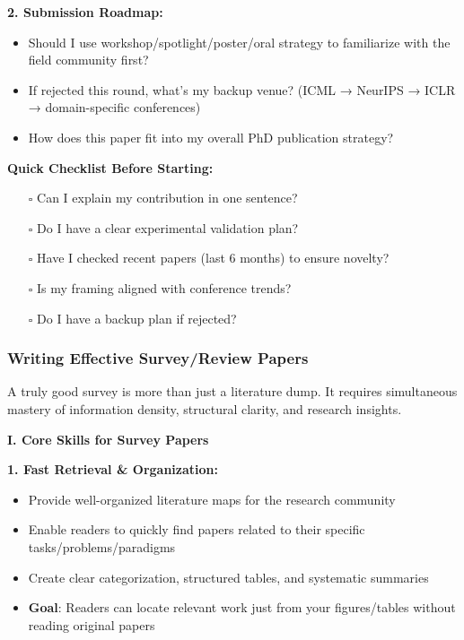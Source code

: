 \documentclass[11pt,a4paper]{article}
\begin{document}
\textbf{2. Submission Roadmap:}
\begin{itemize}
    \item Should I use workshop/spotlight/poster/oral strategy to familiarize with the field community first?
    \item If rejected this round, what's my backup venue? (ICML → NeurIPS → ICLR → domain-specific conferences)
    \item How does this paper fit into my overall PhD publication strategy?
\end{itemize}

\textbf{Quick Checklist Before Starting:}
\begin{enumerate}
    \item[$\square$] Can I explain my contribution in one sentence?
    \item[$\square$] Do I have a clear experimental validation plan?
    \item[$\square$] Have I checked recent papers (last 6 months) to ensure novelty?
    \item[$\square$] Is my framing aligned with conference trends?
    \item[$\square$] Do I have a backup plan if rejected?
\end{enumerate}

\subsubsection{Writing Effective Survey/Review Papers}

\begin{tcolorbox}[colback=green!5,colframe=green!50,title=The Value of Survey Papers]
A truly good survey is more than just a literature dump. It requires simultaneous mastery of information density, structural clarity, and research insights.
\end{tcolorbox}

\textbf{I. Core Skills for Survey Papers}

\textbf{1. Fast Retrieval \& Organization:}
\begin{itemize}
    \item Provide well-organized literature maps for the research community
    \item Enable readers to quickly find papers related to their specific tasks/problems/paradigms
    \item Create clear categorization, structured tables, and systematic summaries
    \item \textbf{Goal}: Readers can locate relevant work just from your figures/tables without reading original papers
\end{itemize}
\end{document}
